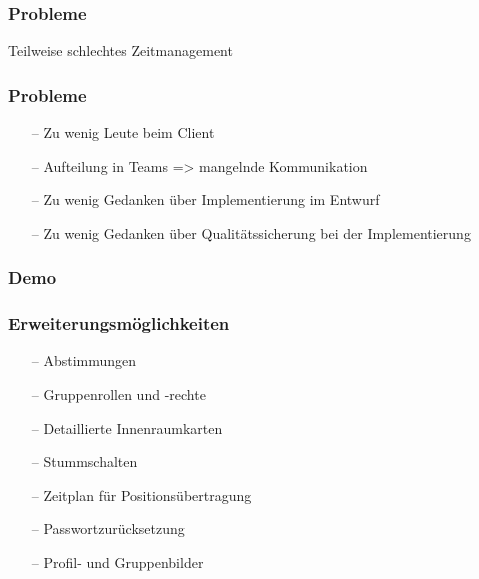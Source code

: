 \documentclass[aspectratio=1610]{beamer}
\begin{document}
    \begin{frame}[plain]
        \frametitle{\textbf{Probleme}}
        Teilweise schlechtes Zeitmanagement
    \end{frame}

    \begin{frame}[plain]
        \frametitle{\textbf{Probleme}}
        \begin{itemize}
            \item[--] Zu wenig Leute beim Client
            \item[--] Aufteilung in Teams => mangelnde Kommunikation
            \item[--] Zu wenig Gedanken über Implementierung im Entwurf
            \item[--] Zu wenig Gedanken über Qualitätssicherung bei der Implementierung
        \end{itemize}
    \end{frame}


  \begin{frame}[plain]
      \frametitle{\textbf{Demo}}

  \end{frame}

  \begin{frame}[plain]
      \frametitle{\textbf{Erweiterungsmöglichkeiten}}
        \begin{itemize}
          \item[--] Abstimmungen
          \item[--] Gruppenrollen und -rechte
          \item[--] Detaillierte Innenraumkarten
          \item[--] Stummschalten
          \item[--] Zeitplan für Positionsübertragung
          \item[--] Passwortzurücksetzung
          \item[--] Profil- und Gruppenbilder
        \end{itemize}
  \end{frame}
\end{document}
